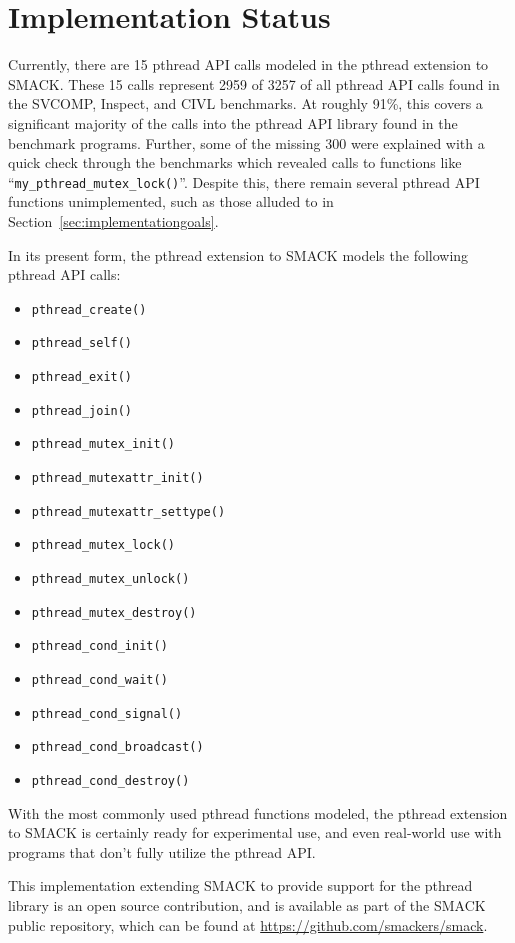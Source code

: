 \section{Implementation Status}
\label{sec:implementationstatus}
Currently, there are 15 pthread API calls modeled in the pthread
extension to SMACK.  These 15 calls represent 2959 of 3257 of all
pthread API calls found in the SVCOMP, Inspect, and CIVL
benchmarks. At roughly 91\%, this covers a significant majority of the
calls into the pthread API library found in the benchmark programs.
Further, some of the missing 300 were explained with a quick check
through the benchmarks which revealed calls to functions like
``\lstinline|my_pthread_mutex_lock()|''.  Despite this, there remain
several pthread API functions unimplemented, such as those alluded to
in Section~\ref{sec:implementationgoals}. 


In its present form, the pthread extension to SMACK models the
following pthread API calls:

\begin{multicols}{2}
\begin{itemize}
\item \lstinline|pthread_create()|
\item \lstinline|pthread_self()|
\item \lstinline|pthread_exit()|
\item \lstinline|pthread_join()|
\item \lstinline|pthread_mutex_init()|
\item \lstinline|pthread_mutexattr_init()|
\item \lstinline|pthread_mutexattr_settype()|
\item \lstinline|pthread_mutex_lock()|
\item \lstinline|pthread_mutex_unlock()|
\item \lstinline|pthread_mutex_destroy()|
\item \lstinline|pthread_cond_init()|
\item \lstinline|pthread_cond_wait()|
\item \lstinline|pthread_cond_signal()|
\item \lstinline|pthread_cond_broadcast()|
\item \lstinline|pthread_cond_destroy()|
\end{itemize}
\end{multicols}

With the most commonly used pthread functions modeled, the pthread
extension to SMACK is certainly ready for experimental use, and even
real-world use with programs that don't fully utilize the pthread
API. 

This implementation extending SMACK to provide support for the
pthread library is an open source contribution, and is available as
part of the SMACK public repository, which can be found at
\url{https://github.com/smackers/smack}.

